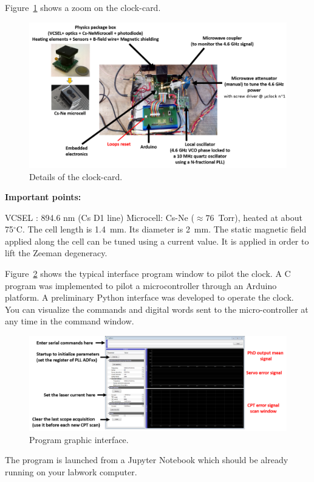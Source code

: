 \documentclass[a4paper,11pt]{article}
\begin{document}
Figure~\ref{fig:clock-card} shows a zoom on the clock-card.

\begin{figure}[h!]
	\centering
	\includegraphics[width=0.9\linewidth]{clock-card}
	\caption{Details of the clock-card.}
	\label{fig:clock-card}
\end{figure}


{\bf Important points: }

VCSEL : 894.6 nm (Cs D1 line) 
Microcell: Cs-Ne ($\approx 76$~Torr), heated at about 75$^\circ$C. The cell length is 1.4~mm. Its diameter is 2~mm.
The static magnetic field applied along the cell can be tuned using a current value. It is applied in order to lift the Zeeman degeneracy. 

Figure~\ref{fig:gui} shows the typical interface program window to pilot the clock. A C program was implemented to pilot a microcontroller through an Arduino platform. A preliminary Python interface was developed to operate the clock. You can visualize the commands and digital words sent to the micro-controller at any time in the command window.

\begin{figure}[h!]
	\centering
	\includegraphics[width=0.9\linewidth]{gui}
	\caption{Program graphic interface.}
	\label{fig:gui}
\end{figure}

The program is launched from a Jupyter Notebook which should be already running on your labwork computer.
\end{document}
